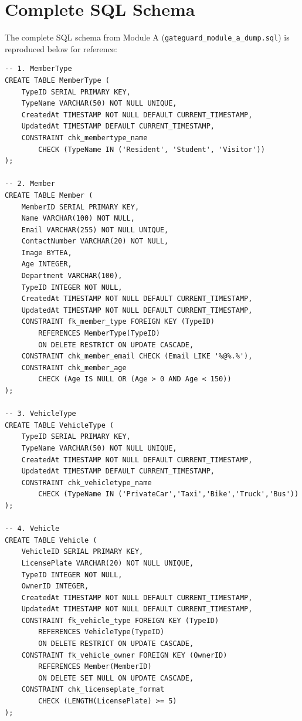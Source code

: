\documentclass[a4paper, 12pt]{article}
\begin{document}
\newpage
\appendix

\section{Complete SQL Schema}
\label{app:schema}

The complete SQL schema from Module A (\texttt{gateguard\_module\_a\_dump.sql}) is reproduced below for reference:

\begingroup
\lstset{aboveskip=2pt, belowskip=2pt, basicstyle=\ttfamily\scriptsize}
\begin{lstlisting}[style=sqlstyle, caption={GateGuard Complete Schema (Module A)}, label={lst:full-schema}]
-- 1. MemberType
CREATE TABLE MemberType (
    TypeID SERIAL PRIMARY KEY,
    TypeName VARCHAR(50) NOT NULL UNIQUE,
    CreatedAt TIMESTAMP NOT NULL DEFAULT CURRENT_TIMESTAMP,
    UpdatedAt TIMESTAMP DEFAULT CURRENT_TIMESTAMP,
    CONSTRAINT chk_membertype_name
        CHECK (TypeName IN ('Resident', 'Student', 'Visitor'))
);

-- 2. Member
CREATE TABLE Member (
    MemberID SERIAL PRIMARY KEY,
    Name VARCHAR(100) NOT NULL,
    Email VARCHAR(255) NOT NULL UNIQUE,
    ContactNumber VARCHAR(20) NOT NULL,
    Image BYTEA,
    Age INTEGER,
    Department VARCHAR(100),
    TypeID INTEGER NOT NULL,
    CreatedAt TIMESTAMP NOT NULL DEFAULT CURRENT_TIMESTAMP,
    UpdatedAt TIMESTAMP NOT NULL DEFAULT CURRENT_TIMESTAMP,
    CONSTRAINT fk_member_type FOREIGN KEY (TypeID)
        REFERENCES MemberType(TypeID)
        ON DELETE RESTRICT ON UPDATE CASCADE,
    CONSTRAINT chk_member_email CHECK (Email LIKE '%@%.%'),
    CONSTRAINT chk_member_age
        CHECK (Age IS NULL OR (Age > 0 AND Age < 150))
);

-- 3. VehicleType
CREATE TABLE VehicleType (
    TypeID SERIAL PRIMARY KEY,
    TypeName VARCHAR(50) NOT NULL UNIQUE,
    CreatedAt TIMESTAMP NOT NULL DEFAULT CURRENT_TIMESTAMP,
    UpdatedAt TIMESTAMP DEFAULT CURRENT_TIMESTAMP,
    CONSTRAINT chk_vehicletype_name
        CHECK (TypeName IN ('PrivateCar','Taxi','Bike','Truck','Bus'))
);

-- 4. Vehicle
CREATE TABLE Vehicle (
    VehicleID SERIAL PRIMARY KEY,
    LicensePlate VARCHAR(20) NOT NULL UNIQUE,
    TypeID INTEGER NOT NULL,
    OwnerID INTEGER,
    CreatedAt TIMESTAMP NOT NULL DEFAULT CURRENT_TIMESTAMP,
    UpdatedAt TIMESTAMP NOT NULL DEFAULT CURRENT_TIMESTAMP,
    CONSTRAINT fk_vehicle_type FOREIGN KEY (TypeID)
        REFERENCES VehicleType(TypeID)
        ON DELETE RESTRICT ON UPDATE CASCADE,
    CONSTRAINT fk_vehicle_owner FOREIGN KEY (OwnerID)
        REFERENCES Member(MemberID)
        ON DELETE SET NULL ON UPDATE CASCADE,
    CONSTRAINT chk_licenseplate_format
        CHECK (LENGTH(LicensePlate) >= 5)
);


\end{lstlisting}
\end{document}
